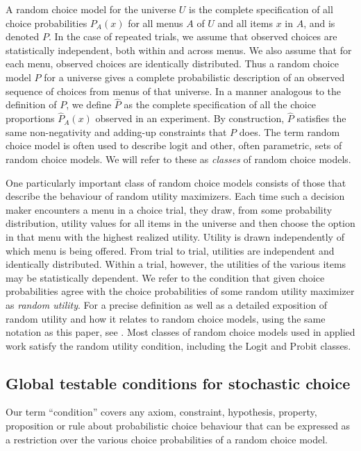 \documentclass[11pt,letter]{article}
\newcommand{\menu}{menu}
\newcommand{\menus}{menus}
\newcommand{\univ}{U}
\begin{document}
A random choice model for the universe $\univ$ is the complete specification of all choice probabilities $P_A(x)$ for all \menus{} $A$ of $U$ and all items $x$ in $A$, and is denoted $P$.
In the case of repeated trials, we assume that observed choices are statistically independent, both within and across menus.
We also assume that for each menu, observed choices are identically distributed.
Thus a random choice model $P$ for a universe gives a complete probabilistic description of an observed sequence of choices from menus of that universe.
In a manner analogous to the definition of $P$, we define $\hat P$ as the complete specification of all the choice proportions $\hat{P}_A(x)$ observed in an experiment.
By construction, $\hat P$ satisfies the same non-negativity and adding-up constraints that $P$ does.
The term random choice model is often used to describe logit and other, often parametric, sets of random choice models.
We will refer to these as {\em classes} of random choice models.

One particularly important class of random choice models consists of those that describe the behaviour of random utility maximizers.
Each time such a decision maker encounters a \menu{} in a choice trial, they draw, from some probability distribution, utility values for all items in the universe and then choose the option in that \menu{} with the highest realized utility.
Utility is drawn independently of which \menu{} is being offered.
From trial to trial, utilities are independent and identically distributed.
Within a trial, however, the utilities of the various items may be statistically dependent.
We refer to the condition that given choice probabilities agree with the choice probabilities of some random utility maximizer as {\em random utility}.
For a precise definition as well as a detailed exposition of random utility and how it relates to random choice models, using the same notation as this paper, see \citet{McCaStobMarlParkBrow20}.
Most classes of random choice models used in applied work satisfy the random utility condition, including the Logit and Probit classes.

\subsection{Global testable conditions for stochastic choice}\label{s:conditions}

Our term ``condition'' covers any axiom, constraint, hypothesis, property, proposition or rule about probabilistic choice behaviour that can be expressed as a restriction over the various choice probabilities of a random choice model.
\end{document}
